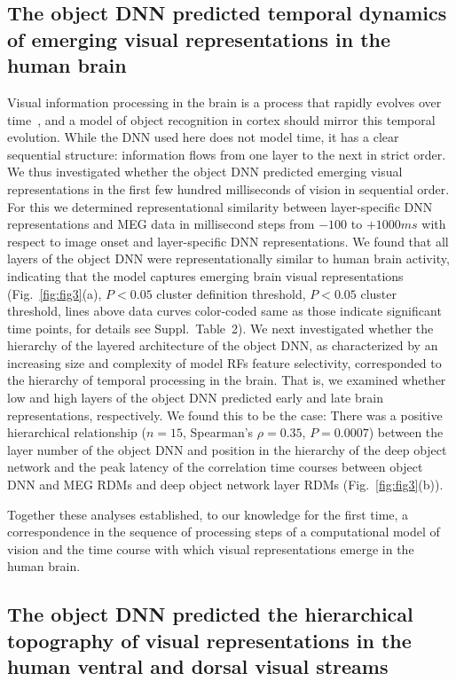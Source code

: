 \documentclass[10pt,twocolumn,letterpaper]{article}
\begin{document}
\subsection{The object DNN predicted temporal dynamics of emerging visual representations in the human brain}
Visual information processing in the brain is a process that rapidly evolves over time~\cite{bullier2001integrated,cichy2014resolving,schmolesky1998signal}, and a model of object recognition in cortex should mirror this temporal evolution. While the DNN used here does not model time, it has a clear sequential structure: information flows from one layer to the next in strict order. We thus investigated whether the object DNN predicted emerging visual representations in the first few hundred milliseconds of vision in sequential order. For this we determined representational similarity between layer-specific DNN representations and MEG data in millisecond steps from $-100$ to $+1000ms$ with respect to image onset and layer-specific DNN representations. We found that all layers of the object DNN were representationally similar to human brain activity, indicating that the model captures emerging brain visual representations (Fig.~\ref{fig:fig3}(a), $P < 0.05$ cluster definition threshold, $P < 0.05$ cluster threshold, lines above data curves color-coded same as those indicate significant time points, for details see Suppl.~Table~2). We next investigated whether the hierarchy of the layered architecture of the object DNN, as characterized by an increasing size and complexity of model RFs feature selectivity, corresponded to the hierarchy of temporal processing in the brain. That is, we examined whether low and high layers of the object DNN predicted early and late brain representations, respectively. We found this to be the case: There was a positive hierarchical relationship ($n = 15$, Spearman's $\rho = 0.35$, $P = 0.0007$) between the layer number of the object DNN and position in the hierarchy of the deep object network and the peak latency of the correlation time courses between object DNN and MEG RDMs and deep object network layer RDMs (Fig.~\ref{fig:fig3}(b)).

Together these analyses established, to our knowledge for the first time, a correspondence in the sequence of processing steps of a computational model of vision and the time course with which visual representations emerge in the human brain.

\subsection{The object DNN predicted the hierarchical topography of visual representations in the human ventral and dorsal visual streams}
\end{document}
